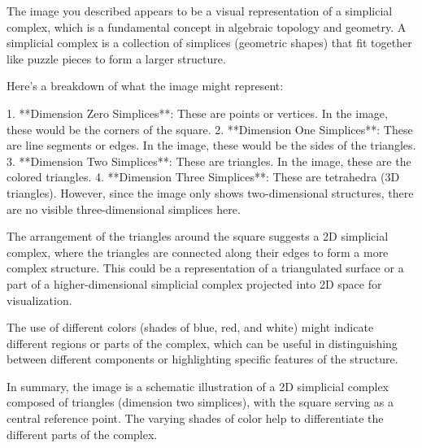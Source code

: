 The image you described appears to be a visual representation of a simplicial complex, which is a fundamental concept in algebraic topology and geometry. A simplicial complex is a collection of simplices (geometric shapes) that fit together like puzzle pieces to form a larger structure.

Here's a breakdown of what the image might represent:

1. **Dimension Zero Simplices**: These are points or vertices. In the image, these would be the corners of the square.
2. **Dimension One Simplices**: These are line segments or edges. In the image, these would be the sides of the triangles.
3. **Dimension Two Simplices**: These are triangles. In the image, these are the colored triangles.
4. **Dimension Three Simplices**: These are tetrahedra (3D triangles). However, since the image only shows two-dimensional structures, there are no visible three-dimensional simplices here.

The arrangement of the triangles around the square suggests a 2D simplicial complex, where the triangles are connected along their edges to form a more complex structure. This could be a representation of a triangulated surface or a part of a higher-dimensional simplicial complex projected into 2D space for visualization.

The use of different colors (shades of blue, red, and white) might indicate different regions or parts of the complex, which can be useful in distinguishing between different components or highlighting specific features of the structure.

In summary, the image is a schematic illustration of a 2D simplicial complex composed of triangles (dimension two simplices), with the square serving as a central reference point. The varying shades of color help to differentiate the different parts of the complex.